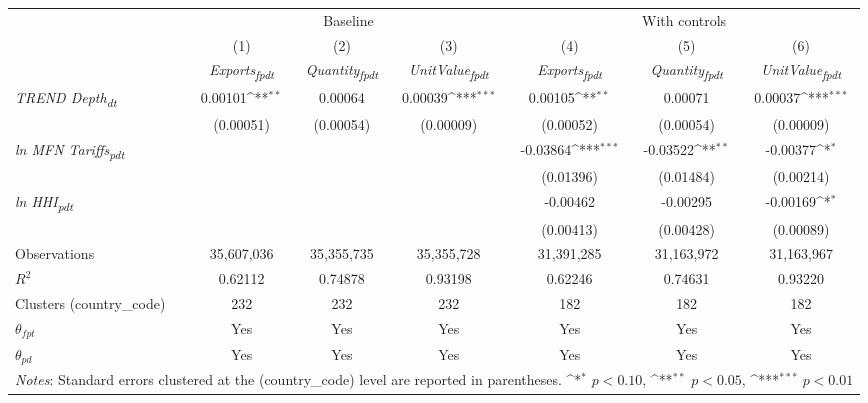 {
\def\sym#1{\ifmmode^{#1}\else\(^{#1}\)\fi}
\begin{tabular}{l*{6}{c}}
\toprule
&\multicolumn{3}{c}{Baseline}&\multicolumn{3}{c}{With controls}\\\cmidrule(lr){2-4}\cmidrule(lr){5-7}
&(1)&(2)&(3)&(4)&(5)&(6)\\
&\textit{Exports\textsubscript{fpdt}}&\textit{Quantity\textsubscript{fpdt}}&\textit{UnitValue\textsubscript{fpdt}}&\textit{Exports\textsubscript{fpdt}}&\textit{Quantity\textsubscript{fpdt}}&\textit{UnitValue\textsubscript{fpdt}}\\
\midrule
\textit{TREND Depth\textsubscript{dt}} & 0.00101\sym{**} & 0.00064 & 0.00039\sym{***} & 0.00105\sym{**} & 0.00071 & 0.00037\sym{***}\\
 & (0.00051) & (0.00054) & (0.00009) & (0.00052) & (0.00054) & (0.00009)\\
\addlinespace
\textit{ln MFN Tariffs\textsubscript{pdt}} &  &  &  & -0.03864\sym{***} & -0.03522\sym{**} & -0.00377\sym{*}\\
 &  &  &  & (0.01396) & (0.01484) & (0.00214)\\
\addlinespace
\textit{ln HHI\textsubscript{pdt}} &  &  &  & -0.00462 & -0.00295 & -0.00169\sym{*}\\
 &  &  &  & (0.00413) & (0.00428) & (0.00089)\\
\midrule
Observations & 35,607,036 & 35,355,735 & 35,355,728 & 31,391,285 & 31,163,972 & 31,163,967\\
$R^{2}$ & 0.62112 & 0.74878 & 0.93198 & 0.62246 & 0.74631 & 0.93220\\
Clusters (country_code) & 232 & 232 & 232 & 182 & 182 & 182\\
$\theta_{fpt}$ & Yes & Yes & Yes & Yes & Yes & Yes\\
$\theta_{pd}$ & Yes & Yes & Yes & Yes & Yes & Yes\\
\bottomrule
\multicolumn{7}{l}{\footnotesize \textit{Notes}: Standard errors clustered at the (country_code) level are reported in parentheses. \sym{*} \(p<0.10\), \sym{**} \(p<0.05\), \sym{***} \(p<0.01\)}\\
\end{tabular}
}
